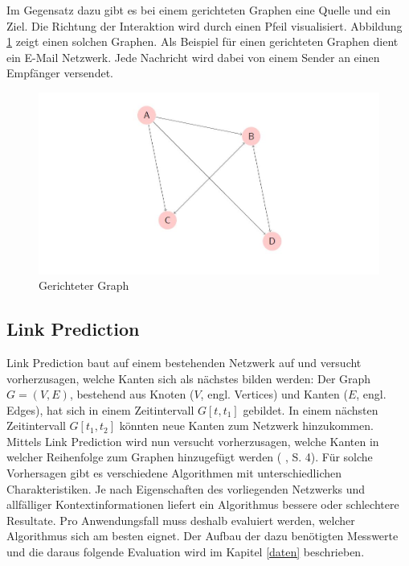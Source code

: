 Im Gegensatz dazu gibt es bei einem gerichteten Graphen eine Quelle und ein Ziel. Die Richtung der Interaktion wird durch einen Pfeil visualisiert.
Abbildung \ref{fig:graph_directed} zeigt einen solchen Graphen.
Als Beispiel für einen gerichteten Graphen dient ein E-Mail Netzwerk. Jede Nachricht wird dabei von einem Sender an einen Empfänger versendet.

\begin{figure}[h]
    \centering
    \includegraphics[scale=0.7]{resources/graph_directed.JPG}
    \caption{Gerichteter Graph}
    \label{fig:graph_directed}
\end{figure}

\subsection{Link Prediction}
Link Prediction baut auf einem bestehenden Netzwerk auf und versucht vorherzusagen, welche Kanten sich als nächstes bilden werden:
Der Graph $G = (V, E)$, bestehend aus Knoten ($V$, engl. Vertices) und Kanten ($E$, engl. Edges), hat sich in einem Zeitintervall $G[t, t_1]$ gebildet.
In einem nächsten Zeitintervall $G[t_1, t_2]$ könnten neue Kanten zum Netzwerk hinzukommen.
Mittels Link Prediction wird nun versucht vorherzusagen, welche Kanten in welcher Reihenfolge zum Graphen hinzugefügt werden (\citeauthor{gao_link_2015} \citeyear{gao_link_2015}, S. 4).
Für solche Vorhersagen gibt es verschiedene Algorithmen mit unterschiedlichen Charakteristiken.
Je nach Eigenschaften des vorliegenden Netzwerks und allfälliger Kontextinformationen liefert ein Algorithmus bessere oder schlechtere Resultate.
Pro Anwendungsfall muss deshalb evaluiert werden, welcher Algorithmus sich am besten eignet.
Der Aufbau der dazu benötigten Messwerte und die daraus folgende Evaluation wird im Kapitel \ref{daten} beschrieben.

